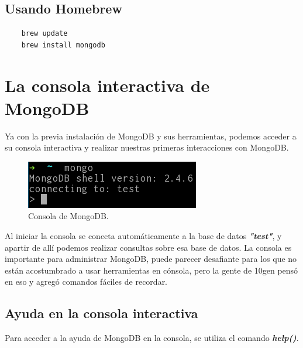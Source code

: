 \subsection*{Usando Homebrew}

\begin{lstlisting}
    brew update
    brew install mongodb
\end{lstlisting}

\section{La consola interactiva de MongoDB}

Ya con la previa instalaci\'on de MongoDB y sus herramientas, podemos acceder a su consola interactiva y realizar nuestras primeras interacciones con MongoDB.

\begin{figure}[!ht]
    \centering
    \includegraphics[scale=1]{img/mongodb_consola} 
    \caption[Consola de MongoDB]{Consola de MongoDB.}
\end{figure}

Al iniciar la consola se conecta autom\'aticamente a la base de datos \textit{\textbf{"test"}}, y apartir de all\'i podemos realizar consultas sobre esa base de datos. La consola es importante para administrar MongoDB, puede parecer desafiante para los que no est\'an acostumbrado a usar herramientas en c\'onsola, pero la gente de 10gen pens\'o en eso y agreg\'o comandos f\'aciles de recordar.

\subsection{Ayuda en la consola interactiva}

Para acceder a la ayuda de MongoDB en la consola, se utiliza el comando \textit{\textbf{help()}}.

